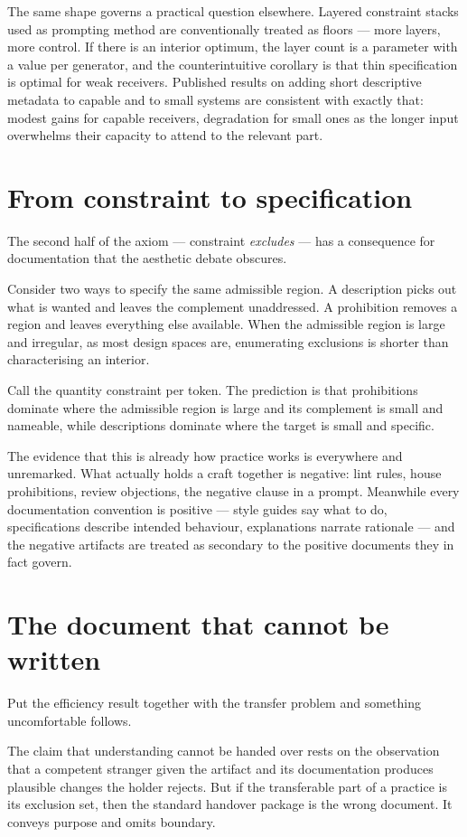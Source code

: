 \documentclass[11pt,a4paper]{article}
\begin{document}
The same shape governs a practical question elsewhere. Layered constraint stacks used as prompting method are conventionally treated as floors --- more layers, more control. If there is an interior optimum, the layer count is a parameter with a value per generator, and the counterintuitive corollary is that thin specification is optimal for weak receivers. Published results on adding short descriptive metadata to capable and to small systems are consistent with exactly that: modest gains for capable receivers, degradation for small ones as the longer input overwhelms their capacity to attend to the relevant part.

\section{From constraint to specification}
The second half of the axiom --- constraint \emph{excludes} --- has a consequence for documentation that the aesthetic debate obscures.

Consider two ways to specify the same admissible region. A description picks out what is wanted and leaves the complement unaddressed. A prohibition removes a region and leaves everything else available. When the admissible region is large and irregular, as most design spaces are, enumerating exclusions is shorter than characterising an interior.

Call the quantity constraint per token. The prediction is that prohibitions dominate where the admissible region is large and its complement is small and nameable, while descriptions dominate where the target is small and specific.

The evidence that this is already how practice works is everywhere and unremarked. What actually holds a craft together is negative: lint rules, house prohibitions, review objections, the negative clause in a prompt. Meanwhile every documentation convention is positive --- style guides say what to do, specifications describe intended behaviour, explanations narrate rationale --- and the negative artifacts are treated as secondary to the positive documents they in fact govern.

\section{The document that cannot be written}
Put the efficiency result together with the transfer problem and something uncomfortable follows.

The claim that understanding cannot be handed over rests on the observation that a competent stranger given the artifact and its documentation produces plausible changes the holder rejects. But if the transferable part of a practice is its exclusion set, then the standard handover package is the wrong document. It conveys purpose and omits boundary.
\end{document}
